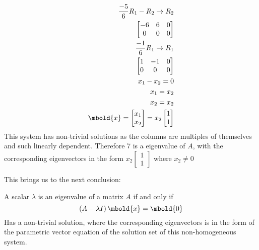\documentclass[12pt letter]{report}
\begin{document}
{{\begin{align*}
      \frac{-5}{6}R_1 - R_2  \rightarrow R_2                                                                                                     \\
      \begin{bmatrix}
        -6 & 6 & 0 \\
        0  & 0 & 0 \\
      \end{bmatrix}
      \\
      \frac{-1}{6}R_1 \to R_1                                                                                                                    \\
      \begin{bmatrix}
        1 & -1 & 0 \\
        0 & 0  & 0 \\
      \end{bmatrix}
      \\
      x_1 -x_2 = 0                                                                                                                               \\
      x_1 = x_2                                                                                                                                  \\
      x_2 =x_2                                                                                                                                   \\
      \mbold{x} = \begin{bmatrix} x_1 \\ x_2 \end{bmatrix} = x_2\begin{bmatrix} 1 \\ 1  \end{bmatrix}
    \end{align*}
    This system has non-trivial solutions as the columns are multiples of themselves and such linearly dependent.
    Therefore 7 is a eigenvalue of $A$, with the corresponding eigenvectors in the form $x_2 \begin{bmatrix} 1 \\ 1
      \end{bmatrix} $ where $x_2 \neq 0$
  }
}

This brings us to the next conclusion:

A scalar $\lambda $ is an eigenvalue of a matrix $A$ if and only if
\begin{equation}
  \left( A - \lambda I \right) \mbold{x} = \mbold{0}
  \label{eq:1}
\end{equation}
Has a non-trivial solution, where the corresponding eigenvectors is in the form of the parametric vector equation of the
solution set of this non-homogeneous system.
\end{document}
